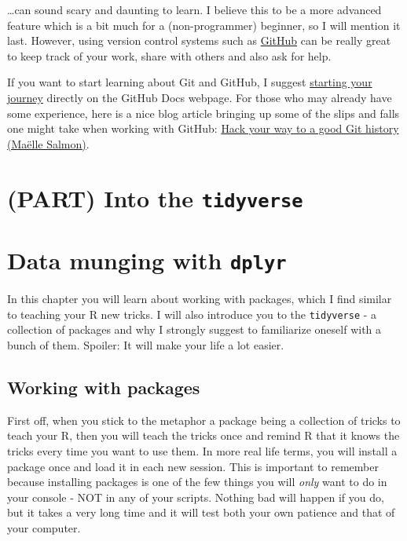 \documentclass[
]{book}
\begin{document}
\ldots can sound scary and daunting to learn.
I believe this to be a more advanced feature which is a bit much for a (non-programmer) beginner, so I will mention it last.
However, using version control systems such as \href{https://github.com/}{GitHub} can be really great to keep track of your work, share with others and also ask for help.

If you want to start learning about Git and GitHub, I suggest \href{https://docs.github.com/en/get-started/start-your-journey/about-github-and-git}{starting your journey} directly on the GitHub Docs webpage.
For those who may already have some experience, here is a nice blog article bringing up some of the slips and falls one might take when working with GitHub: \href{https://www.r-bloggers.com/2024/06/hack-your-way-to-a-good-git-history/}{Hack your way to a good Git history (Maëlle Salmon)}.

\chapter*{\texorpdfstring{(PART) Into the \texttt{tidyverse}}{(PART) Into the tidyverse}}\label{part-into-the-tidyverse}

\chapter{\texorpdfstring{Data munging with \texttt{dplyr}}{Data munging with dplyr}}\label{dplyr}

In this chapter you will learn about working with packages, which I find similar to teaching your R new tricks.
I will also introduce you to the \texttt{tidyverse} - a collection of packages and why I strongly suggest to familiarize oneself with a bunch of them.
Spoiler: It will make your life a lot easier.

\section{Working with packages}\label{working-with-packages}

First off, when you stick to the metaphor a package being a collection of tricks to teach your R, then you will teach the tricks once and remind R that it knows the tricks every time you want to use them.
In more real life terms, you will install a package once and load it in each new session.
This is important to remember because installing packages is one of the few things you will \emph{only} want to do in your console - NOT in any of your scripts.
Nothing bad will happen if you do, but it takes a very long time and it will test both your own patience and that of your computer.
\end{document}
